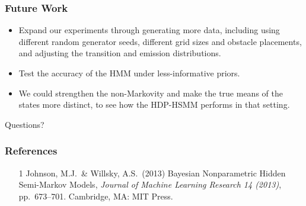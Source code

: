 \documentclass{beamer}
\begin{document}
\begin{frame}
	\frametitle{Future Work}
		\begin{itemize}
			\item Expand our experiments through generating more data, including using different random generator seeds, different grid sizes and obstacle placements, and adjusting the transition and emission distributions.
			\item Test the accuracy of the HMM under less-informative priors.
			\item We could strengthen the non-Markovity and make the true means of the states more distinct, to see how the HDP-HSMM performs in that setting.
		\end{itemize}
\end{frame}

\begin{frame}
	\centering
	\huge{Questions?}
\end{frame}


\begin{frame}
    \frametitle{References}
    \begin{itemize}
        \item [1] Johnson, M.J.\ \& Willsky, A.S.\ (2013) Bayesian Nonparametric Hidden Semi-Markov Models, {\it Journal of Machine Learning Research 14 (2013)},
        pp.\ 673--701. Cambridge, MA: MIT Press.
    \end{itemize}
\end{frame}
\end{document}
